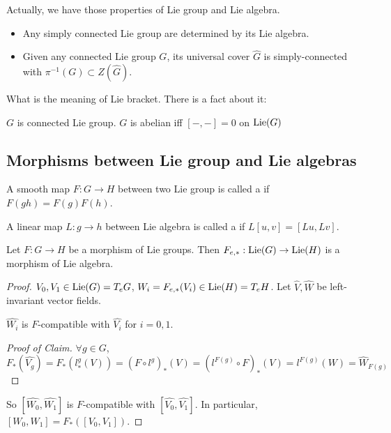 Actually, we have those properties of Lie group and Lie algebra.
\begin{itemize}
    \item Any simply connected Lie group are determined by its Lie algebra.
    \item Given any connected Lie group  $ G $, its universal cover  $ \hat{G} $  is simply-connected with  $ \pi^{-1}(G)\subset Z(\hat{G}) $. 
\end{itemize}
What is the meaning of Lie bracket. There is a fact about it:
\begin{fact}
     $ G $ is connected Lie group.  $ G $ is abelian iff  $ [-,-]=0 $ on  $ \mathrm{Lie}(G) $    
\end{fact}
\subsection{Morphisms between Lie group and Lie algebras}
A smooth map  $ F:G\rightarrow H $ between two Lie group is called a  if  $ F(gh)=F(g)F(h) $.

A linear map  $ L:g\rightarrow h$ between Lie algebra is called a  if  $ L[u,v]=[Lu,Lv] $. 
\begin{proposition}
     Let  $ F:G\rightarrow H $ be a morphism of Lie groups. Then  $ F_{e,*}:\mathrm{Lie}(G)\rightarrow \mathrm{Lie}(H) $ is a morphism of Lie algebra.  
\end{proposition}
\begin{proof}
      $ V_0,V_1\in \mathrm{Lie}(G)=T_eG $,  $ W_i=F_{e,*}(V_i)\in \mathrm{Lie}(H)=T_eH $. Let  $ \hat{V},\hat{W} $ be left-invariant vector fields.   
     \begin{claim}
          $ \hat{W_i} $ is  $ F $-compatible with  $ \hat{V_i} $ for  $ i=0,1 $.    
     \end{claim}
     \begin{proof}[Proof of Claim]
          $ \forall g\in G $,  $ F_*(\hat{V_g})=F_*(l_*^g(V))=(F\circ l^g)_*(V)=(l^{F(g)}\circ F)_*(V)=l^{F(g)}(W)=\hat{W}_{F(g)} $  
     \end{proof}
     So  $ [\hat{W_0},\hat{W_1}] $ is  $ F $-compatible with  $ [\hat{V_0},\hat{V_1}] $. In particular,  $ [W_0,W_1]=F_*([V_0,V_1]) $.  
\end{proof}


 